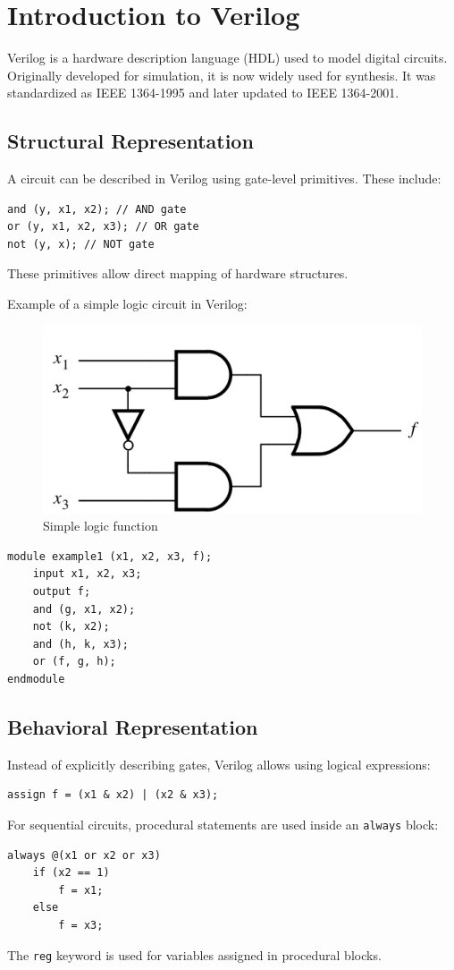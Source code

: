 \documentclass{article}
\begin{document}
\section{Introduction to Verilog}
Verilog is a hardware description language (HDL) used to model digital circuits. Originally developed for simulation, it is now widely used for synthesis. It was standardized as IEEE 1364-1995 and later updated to IEEE 1364-2001.

\subsection{Structural Representation}
A circuit can be described in Verilog using gate-level primitives. These include:
\begin{lstlisting}
and (y, x1, x2); // AND gate
or (y, x1, x2, x3); // OR gate
not (y, x); // NOT gate
\end{lstlisting}
These primitives allow direct mapping of hardware structures.

Example of a simple logic circuit in Verilog:

\begin{figure}[h!]
   \centering
   \includegraphics[width=\linewidth]{example.jpg}
	\caption{Simple logic function}
   \label{stemplot}
\end{figure}

\begin{lstlisting}
module example1 (x1, x2, x3, f);
    input x1, x2, x3;
    output f;
    and (g, x1, x2);
    not (k, x2);
    and (h, k, x3);
    or (f, g, h);
endmodule
\end{lstlisting}

\subsection{Behavioral Representation}
Instead of explicitly describing gates, Verilog allows using logical expressions:
\begin{lstlisting}
assign f = (x1 & x2) | (x2 & x3);
\end{lstlisting}
For sequential circuits, procedural statements are used inside an \texttt{always} block:
\begin{lstlisting}
always @(x1 or x2 or x3)
    if (x2 == 1) 
        f = x1;
    else 
        f = x3;
\end{lstlisting}
The \texttt{reg} keyword is used for variables assigned in procedural blocks.
\end{document}
